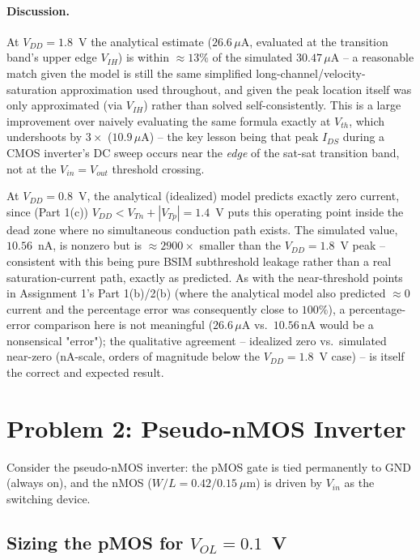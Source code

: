 \paragraph{Discussion.} At $V_{DD}=1.8$~V the analytical estimate
($26.6\,\mu\text{A}$, evaluated at the transition band's upper edge $V_{IH}$) is
within $\approx13\%$ of the simulated $30.47\,\mu\text{A}$ -- a reasonable match
given the model is still the same simplified long-channel/velocity-saturation
approximation used throughout, and given the peak location itself was only
approximated (via $V_{IH}$) rather than solved self-consistently. This is a
large improvement over naively evaluating the same formula exactly at $V_{th}$,
which undershoots by $3\times$ ($10.9\,\mu\text{A}$) -- the key lesson being
that peak $I_{DS}$ during a CMOS inverter's DC sweep occurs near the \emph{edge}
of the sat-sat transition band, not at the $V_{in}=V_{out}$ threshold crossing.

At $V_{DD}=0.8$~V, the analytical (idealized) model predicts exactly zero
current, since (Part 1(c)) $V_{DD}<V_{Tn}+|V_{Tp}|=1.4$~V puts this operating
point inside the dead zone where no simultaneous conduction path exists. The
simulated value, $10.56$~nA, is nonzero but is $\approx2900\times$ smaller than
the $V_{DD}=1.8$~V peak -- consistent with this being pure BSIM subthreshold
leakage rather than a real saturation-current path, exactly as predicted. As
with the near-threshold points in Assignment 1's Part 1(b)/2(b) (where the
analytical model also predicted $\approx0$ current and the percentage error was
consequently close to $100\%$), a percentage-error comparison here is not
meaningful ($26.6\,\mu\text{A}$ vs.\ $10.56\,\text{nA}$ would be a nonsensical
"error"); the qualitative agreement -- idealized zero vs.\ simulated near-zero
(nA-scale, orders of magnitude below the $V_{DD}=1.8$~V case) -- is itself the
correct and expected result.

\section{Problem 2: Pseudo-nMOS Inverter}

Consider the pseudo-nMOS inverter: the pMOS gate is tied permanently to GND
(always on), and the nMOS ($W/L = 0.42/0.15\ \mu\text{m}$) is driven by $V_{in}$
as the switching device.

\subsection{Sizing the pMOS for $V_{OL} = 0.1$~V}

